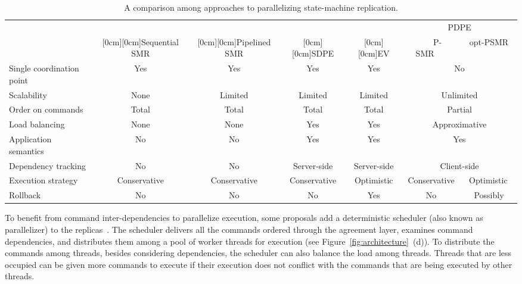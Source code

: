 \documentclass[conference]{IEEEtran}
\begin{document}
\newcommand{\rb}[1]{\raisebox{1ex}[0cm][0cm]{#1}}

\begin{table*}[ht]
\normalsize
\centering
\begin{tabular}{|l|c|c|c|c|c|c|} \hline
& 	& 	& 		& 	& \multicolumn{2}{c|}{PDPE} \\ \cline{6-7}	
						& \rb{Sequential SMR} & \rb{Pipelined SMR} & \rb{SDPE} &	\rb{EV}		& ~~~P-SMR~~~	& 	opt-PSMR \\ \hline\hline 
Single coordination point 		& Yes	& Yes 		& Yes		& Yes		&  \multicolumn{2}{c|}{No}		\\ \hline
Scalability					& None	& Limited		& Limited		& Limited		& \multicolumn{2}{c|}{Unlimited} \\  \hline Order on commands			& Total	& Total		& Total		& Total		&  \multicolumn{2}{c|}{Partial}	\\ \hline
Load balancing				& None	& None		& Yes		& Yes		& \multicolumn{2}{c|}{Approximative}	\\ \hline 
Application semantics		& No		& No			& Yes		& Yes		& \multicolumn{2}{c|}{Yes} 		\\ \hline
Dependency tracking		& No		& No			& Server-side	& Server-side	& \multicolumn{2}{c|}{Client-side}	\\ \hline
Execution strategy			& Conservative	& Conservative & Conservative & Optimistic & Conservative	& ~Optimistic~\, \\ \hline
Rollback					& No		& No			& No			& Yes		& No    		& Possibly 	\\ \hline
\end{tabular}
\vspace {5mm}
\caption{A comparison among approaches to parallelizing state-machine replication.}
\vspace{-5mm}
\label{table:survey}
\end{table*}

To benefit from command inter-dependencies to parallelize execution, some proposals add a deterministic scheduler (also known as parallelizer) to the replicas~\cite{KD2004}. 
The scheduler delivers all the commands ordered through the agreement layer, examines command dependencies, and distributes them among a pool of worker threads for execution (see Figure~\ref{fig:architecture}~(d)). 
To distribute the commands among threads, besides considering dependencies, the scheduler can also balance the load among threads. 
Threads that are less occupied can be given more commands to execute if their execution does not conflict with the commands that are being executed by other threads. 
\end{document}
